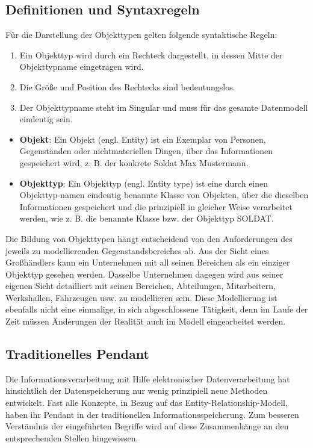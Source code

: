 \subsection{Definitionen und Syntaxregeln}
Für die Darstellung der Objekttypen gelten folgende syntaktische
Regeln:
\begin {enumerate}
\item Ein Objekttyp wird durch ein Rechteck dargestellt, in dessen
Mitte der Objekttypname eingetragen wird.
\begin{center}
\end{center}
\item Die Größe und Position des Rechtecks sind bedeutungslos.
\item Der Objekttypname steht im Singular und muss für
das gesamte Datenmodell eindeutig sein.
\end{enumerate}
\begin{merke}
    \begin{itemize}
        \item \textbf{Objekt}: Ein Objekt (engl. Entity) ist ein Exemplar von Personen, Gegenständen oder nichtmateriellen Dingen, über das Informationen gespeichert wird, z. B. der konkrete Soldat Max Mustermann.
        \item \textbf{Objekttyp}: Ein Objekttyp (engl. Entity type) ist eine durch einen Objekttyp-namen eindeutig benannte Klasse von Objekten, über die dieselben Informationen gespeichert und die prinzipiell in gleicher Weise verarbeitet werden, wie z. B. die benannte Klasse bzw. der Objekttyp SOLDAT.
    \end{itemize}
\end{merke}

Die Bildung von Objekttypen hängt entscheidend von den Anforderungen
des jeweils zu modellierenden Gegenstandsbereiches ab. Aus der Sicht
eines Großhändlers kann ein Unternehmen mit all seinen Bereichen
als ein einziger Objekttyp gesehen werden. Dasselbe Unternehmen dagegen
wird aus seiner eigenen Sicht detailliert mit seinen Bereichen,
Abteilungen, Mitarbeitern, Werkshallen, Fahrzeugen usw. zu modellieren
sein. Diese Modellierung ist ebenfalls nicht eine einmalige, in sich
abgeschlossene Tätigkeit, denn im Laufe der Zeit müssen Änderungen
der Realität auch im Modell eingearbeitet werden.
\subsection{Traditionelles Pendant}
Die Informationsverarbeitung mit Hilfe elektronischer Datenverarbeitung
hat hinsichtlich der Datenspeicherung nur wenig prinzipiell neue
Methoden entwickelt. Fast alle Konzepte, in Bezug auf das
Entity-Relationship-Modell, haben ihr Pendant in der traditionellen
Informationsspeicherung. Zum besseren Verständnis der eingeführten
Begriffe wird auf diese Zusammenhänge an den entsprechenden Stellen
hingewiesen.


